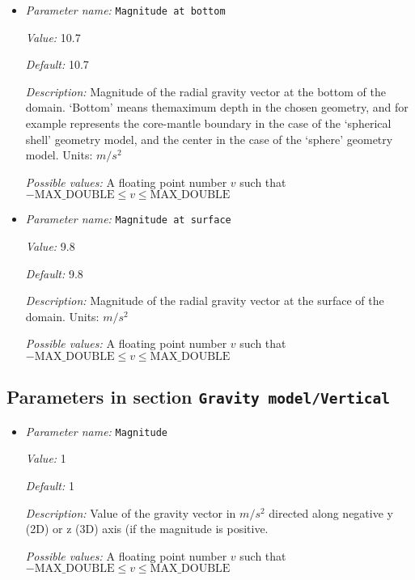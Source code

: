 \begin{itemize}
\item {\it Parameter name:} {\tt Magnitude at bottom}
\label{parameters:Gravity model/Radial linear/Magnitude at bottom}
\label{parameters:Gravity_20model/Radial_20linear/Magnitude_20at_20bottom}


{\it Value:} 10.7


{\it Default:} 10.7


{\it Description:} Magnitude of the radial gravity vector at the bottom of the domain. `Bottom' means themaximum depth in the chosen geometry, and for example represents the core-mantle boundary in the case of the `spherical shell' geometry model, and the center in the case of the `sphere' geometry model. Units: $m/s^2$


{\it Possible values:} A floating point number $v$ such that $-\text{MAX\_DOUBLE} \leq v \leq \text{MAX\_DOUBLE}$
\item {\it Parameter name:} {\tt Magnitude at surface}
\label{parameters:Gravity model/Radial linear/Magnitude at surface}
\label{parameters:Gravity_20model/Radial_20linear/Magnitude_20at_20surface}


{\it Value:} 9.8


{\it Default:} 9.8


{\it Description:} Magnitude of the radial gravity vector at the surface of the domain. Units: $m/s^2$


{\it Possible values:} A floating point number $v$ such that $-\text{MAX\_DOUBLE} \leq v \leq \text{MAX\_DOUBLE}$
\end{itemize}

\subsection{Parameters in section \tt Gravity model/Vertical}
\label{parameters:Gravity_20model/Vertical}

\begin{itemize}
\item {\it Parameter name:} {\tt Magnitude}
\label{parameters:Gravity model/Vertical/Magnitude}
\label{parameters:Gravity_20model/Vertical/Magnitude}


{\it Value:} 1


{\it Default:} 1


{\it Description:} Value of the gravity vector in $m/s^2$ directed along negative y (2D) or z (3D) axis (if the magnitude is positive.


{\it Possible values:} A floating point number $v$ such that $-\text{MAX\_DOUBLE} \leq v \leq \text{MAX\_DOUBLE}$
\end{itemize}

